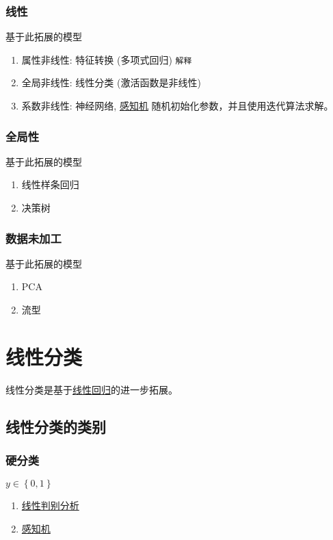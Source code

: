 \documentclass[11pt]{article}
\begin{document}
\subsubsection{线性}
\label{sec:org8c580a1}
基于此拓展的模型
\begin{enumerate}
\item 属性非线性: 特征转换 (多项式回归)
\label{sec:orgcf7865b}
\texttt{解释}
\item 全局非线性: 线性分类 (激活函数是非线性)
\label{sec:org80401fc}
\item 系数非线性: 神经网络, \href{感知机.org}{感知机}
\label{sec:orgd568c6b}
随机初始化参数，并且使用迭代算法求解。
\end{enumerate}
\subsubsection{全局性}
\label{sec:orgf4a788b}
基于此拓展的模型
\begin{enumerate}
\item 线性样条回归
\label{sec:org51846b2}
\item 决策树
\label{sec:org184b605}
\end{enumerate}
\subsubsection{数据未加工}
\label{sec:orga995de2}
基于此拓展的模型
\begin{enumerate}
\item PCA
\label{sec:org6a9f713}
\item 流型
\label{sec:org856a12b}
\end{enumerate}
\section{线性分类}
\label{sec:orgc8dd216}
线性分类是基于\hyperref[sec:orgf822865]{线性回归}的进一步拓展。
\subsection{线性分类的类别}
\label{sec:orgdb341de}
\subsubsection{硬分类}
\label{sec:org3863831}
\(y \in \left\{ 0,1 \right\}\)
\begin{enumerate}
\item \href{线性判别分析.org}{线性判别分析}
\label{sec:org9e4236e}
\item \href{感知机.org}{感知机}
\label{sec:org38528ff}
\end{enumerate}
\end{document}
